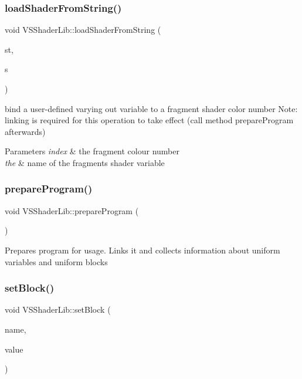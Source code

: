 \subsubsection{\texorpdfstring{load\+Shader\+From\+String()}{loadShaderFromString()}}
{\footnotesize\ttfamily void V\+S\+Shader\+Lib\+::load\+Shader\+From\+String (\begin{DoxyParamCaption}\item[{\hyperlink{class_v_s_shader_lib_ae8a4410569faa6d4df9760e998a9706a}{V\+S\+Shader\+Lib\+::\+Shader\+Type}}]{st,  }\item[{const char $\ast$}]{s }\end{DoxyParamCaption})}

bind a user-\/defined varying out variable to a fragment shader color number Note\+: linking is required for this operation to take effect (call method prepare\+Program afterwards)


\begin{DoxyParams}{Parameters}
{\em index} & the fragment colour number \\
\hline
{\em the} & name of the fragment\textquotesingle{}s shader variable \\
\hline
\end{DoxyParams}
\mbox{\label{class_v_s_shader_lib_ae320649bc8d42fdadaedc115bd60e671}} 
\subsubsection{\texorpdfstring{prepare\+Program()}{prepareProgram()}}
{\footnotesize\ttfamily void V\+S\+Shader\+Lib\+::prepare\+Program (\begin{DoxyParamCaption}{ }\end{DoxyParamCaption})}

Prepares program for usage. Links it and collects information about uniform variables and uniform blocks \mbox{\label{class_v_s_shader_lib_a4dded68b0735edf595dd5dbf56c956b1}} 
\subsubsection{\texorpdfstring{set\+Block()}{setBlock()}}
{\footnotesize\ttfamily void V\+S\+Shader\+Lib\+::set\+Block (\begin{DoxyParamCaption}\item[{std\+::string}]{name,  }\item[{void $\ast$}]{value }\end{DoxyParamCaption})\hspace{0.3cm}{\ttfamily [static]}}



